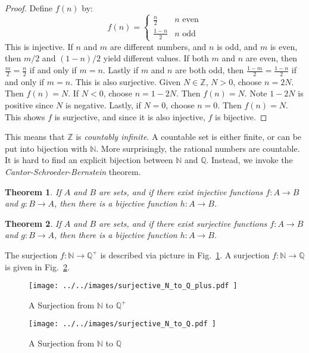 \documentclass{article}
\theoremstyle{plain}
\newtheorem{theorem}{Theorem}[section]
\theoremstyle{normal}
\begin{document}
        \begin{proof}
            Define $f(n)$ by:
            \begin{equation}
                f(n)=
                \begin{cases}
                    \frac{n}{2}&n\textrm{ even}\\
                    \frac{1-n}{2}&n\textrm{ odd}
                \end{cases}
            \end{equation}
            This is injective. If $n$ and $m$ are different numbers, and
            $n$ is odd, and $m$ is even, then $m/2$ and $(1-n)/2$ yield
            different values. If both $m$ and $n$ are even,
            then $\frac{m}{2}=\frac{n}{2}$ if and only if $m=n$. Lastly if
            $m$ and $n$ are both odd, then
            $\frac{1-m}{2}=\frac{1-n}{2}$ if and only if $m=n$. This is
            also surjective. Given $N\in\mathbb{Z}$, $N>0$, choose
            $n=2N$. Then $f(n)=N$. If $N<0$, choose
            $n=1-2N$. Then $f(n)=N$. Note $1-2N$ is positive since $N$ is
            negative. Lastly, if $N=0$, choose $n=0$. Then $f(n)=N$. This shows
            $f$ is surjective, and since it is also injective, $f$ is bijective.
        \end{proof}
        This means that $\mathbb{Z}$ is \textit{countably infinite}. A
        countable set is either finite, or can be put into bijection with
        $\mathbb{N}$. More surprisingly, the rational numbers are countable.
        It is hard to find an explicit bijection between $\mathbb{N}$ and
        $\mathbb{Q}$. Instead, we invoke the
        \textit{Cantor-Schroeder-Bernstein} theorem.
        \begin{theorem}
            If $A$ and $B$ are sets, and if there exist injective functions
            $f:A\rightarrow{B}$ and $g:B\rightarrow{A}$, then there is a
            bijective function $h:A\rightarrow{B}$.
        \end{theorem}
        \begin{theorem}
            If $A$ and $B$ are sets, and if there exist surjective functions
            $f:A\rightarrow{B}$ and $g:B\rightarrow{A}$, then there is a
            bijective function $h:A\rightarrow{B}$.
        \end{theorem}
        The surjection $f:\mathbb{N}\rightarrow\mathbb{Q}^{+}$ is described
        via picture in Fig.~\ref{fig:surjective_N_to_Q_plus}. A surjection
        $f:\mathbb{N}\rightarrow\mathbb{Q}$ is given in
        Fig.~\ref{fig:surjective_N_to_Q}.
        \begin{figure}
            \centering
            \texttt{[image: ../../images/surjective\_N\_to\_Q\_plus.pdf ]}
            \caption{A Surjection from $\mathbb{N}$ to $\mathbb{Q}^{+}$}
            \label{fig:surjective_N_to_Q_plus}
        \end{figure}
        \begin{figure}
            \centering
            \texttt{[image: ../../images/surjective\_N\_to\_Q.pdf ]}
            \caption{A Surjection from $\mathbb{N}$ to $\mathbb{Q}$}
            \label{fig:surjective_N_to_Q}
        \end{figure}
\end{document}
